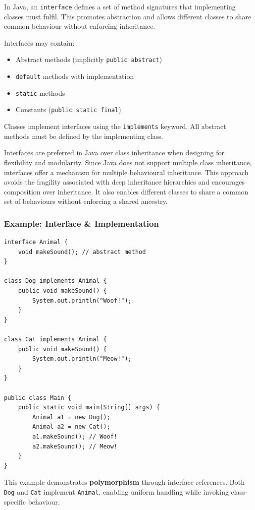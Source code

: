 \documentclass{article}
\newcommand{\codecmd}[1]{\textcolor[rgb]{0,0.5,0}{\texttt{#1}}}
\begin{document}
In Java, an \codecmd{interface} defines a set of method signatures that implementing classes must fulfil. This promotes abstraction and allows different classes to share common behaviour without enforcing inheritance.

Interfaces may contain:
\begin{itemize}
    \item Abstract methods (implicitly \codecmd{public abstract})
    \item \codecmd{default} methods with implementation
    \item \codecmd{static} methods
    \item Constants (\codecmd{public static final})
\end{itemize}

Classes implement interfaces using the \codecmd{implements} keyword. All abstract methods must be defined by the implementing class.

Interfaces are preferred in Java over class inheritance when designing for flexibility and modularity. Since Java does not support multiple class inheritance, interfaces offer a mechanism for multiple behavioural inheritance. This approach avoids the fragility associated with deep inheritance hierarchies and encourages composition over inheritance. It also enables different classes to share a common set of behaviours without enforcing a shared ancestry.


\subsubsection*{Example: Interface \& Implementation}

\begin{verbatim}
interface Animal {
    void makeSound(); // abstract method
}

class Dog implements Animal {
    public void makeSound() {
        System.out.println("Woof!");
    }
}

class Cat implements Animal {
    public void makeSound() {
        System.out.println("Meow!");
    }
}

public class Main {
    public static void main(String[] args) {
        Animal a1 = new Dog();
        Animal a2 = new Cat();
        a1.makeSound(); // Woof!
        a2.makeSound(); // Meow!
    }
}
\end{verbatim}

This example demonstrates \textbf{polymorphism} through interface references. Both \codecmd{Dog} and \codecmd{Cat} implement \codecmd{Animal}, enabling uniform handling while invoking class-specific behaviour.
\end{document}
